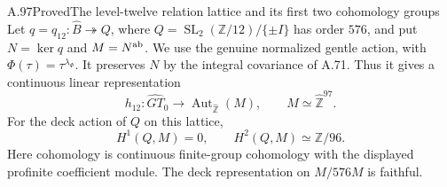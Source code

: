 \begin{statement}{A.97}{Proved}{The level-twelve relation lattice and its first two cohomology groups}
Let $q=q_{12}:\widehat B\twoheadrightarrow Q$, where
$Q=\operatorname{SL}_2(\mathbb Z/12)/\{\pm I\}$ has order $576$,
and put $N=\ker q$ and $M=N^{\rm ab}$.  We use the genuine
normalized gentle action, with $\Phi(\tau)=\tau^{\lambda_\Phi}$.
It preserves $N$ by the integral covariance of A.71.  Thus it
gives a continuous linear representation
\[
 h_{12}:\widehat{GT}_0\longrightarrow
          \operatorname{Aut}_{\widehat{\mathbb Z}}(M),
 \qquad M\simeq\widehat{\mathbb Z}^{97}.
\]
For the deck action of $Q$ on this lattice,
\[
 H^1(Q,M)=0,\qquad H^2(Q,M)\simeq\mathbb Z/96.
\]
Here cohomology is continuous finite-group cohomology with the
displayed profinite coefficient module. The deck representation
on $M/576M$ is faithful.
\end{statement}
